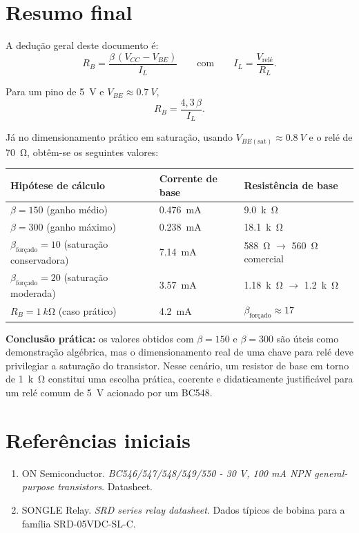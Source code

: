\documentclass[12pt,a4paper]{article}
\newcommand{\Vcc}{V_{CC}}
\newcommand{\Vbe}{V_{BE}}
\newcommand{\Vbesat}{V_{BE(\mathrm{sat})}}
\newcommand{\Il}{I_L}
\newcommand{\Rb}{R_B}
\newcommand{\Rl}{R_L}
\newcommand{\betaf}{\beta_{\text{forçado}}}
\begin{document}
\section{Resumo final}

A dedução geral deste documento é:
\begin{equation}
\boxed{\Rb = \frac{\beta\,(\Vcc - \Vbe)}{\Il}}
\qquad \text{com} \qquad
\Il = \frac{V_{\text{relé}}}{\Rl}.
\end{equation}

Para um pino de \SI{5}{V} e $\Vbe \approx \SI{0,7}{V}$,
\begin{equation}
\boxed{\Rb = \frac{4,3\,\beta}{\Il}}.
\end{equation}

Já no dimensionamento prático em saturação, usando $\Vbesat \approx \SI{0,8}{V}$ e o relé de \SI{70}{\ohm}, obtêm-se os seguintes valores:
\begin{center}
\begin{tabular}{>{\raggedright\arraybackslash}p{5.2cm} >{\centering\arraybackslash}p{3.0cm} >{\centering\arraybackslash}p{3.0cm}}
\toprule
Hipótese de cálculo & Corrente de base & Resistência de base \\
\midrule
$\beta = 150$ (ganho médio) & \SI{0,476}{mA} & \SI{9,0}{k\ohm} \\
$\beta = 300$ (ganho máximo) & \SI{0,238}{mA} & \SI{18,1}{k\ohm} \\
$\betaf = 10$ (saturação conservadora) & \SI{7,14}{mA} & \SI{588}{\ohm} $\to$ \SI{560}{\ohm} comercial \\
$\betaf = 20$ (saturação moderada) & \SI{3,57}{mA} & \SI{1,18}{k\ohm} $\to$ \SI{1,2}{k\ohm} \\
$\Rb = \SI{1}{k\ohm}$ (caso prático) & \SI{4,2}{mA} & $\betaf \approx 17$ \\
\bottomrule
\end{tabular}
\end{center}

\bigskip

\noindent\textbf{Conclusão prática:} os valores obtidos com $\beta = 150$ e $\beta = 300$ são úteis como demonstração algébrica, mas o dimensionamento real de uma chave para relé deve privilegiar a saturação do transistor. Nesse cenário, um resistor de base em torno de \SI{1}{k\ohm} constitui uma escolha prática, coerente e didaticamente justificável para um relé comum de \SI{5}{V} acionado por um BC548.

\section*{Referências iniciais}

\begin{enumerate}[leftmargin=1.0cm]
    \item ON Semiconductor. \textit{BC546/547/548/549/550 - 30 V, 100 mA NPN general-purpose transistors}. Datasheet.
    \item SONGLE Relay. \textit{SRD series relay datasheet}. Dados típicos de bobina para a família SRD-05VDC-SL-C.
\end{enumerate}
\end{document}
